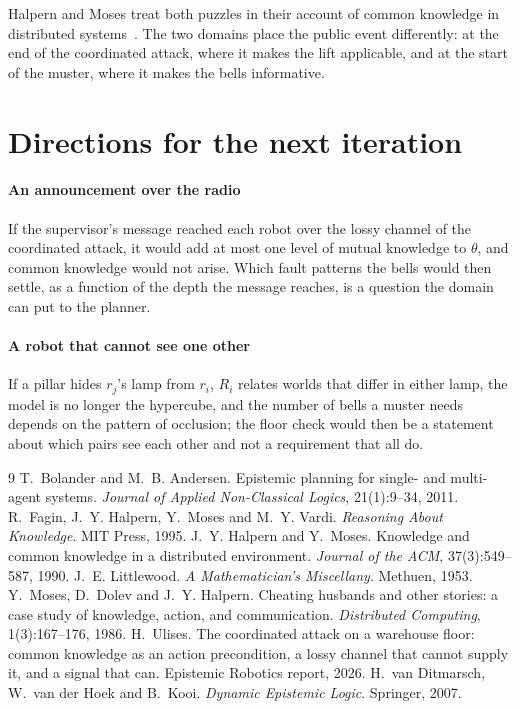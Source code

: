 \documentclass[11pt,a4paper]{article}
\theoremstyle{definition}
\newcommand{\some}{\theta}
\begin{document}
Halpern and Moses treat both puzzles in their account of common knowledge in
distributed systems~\cite{halpern1990}. The two domains place the public event
differently: at the end of the coordinated attack, where it makes the lift
applicable, and at the start of the muster, where it makes the bells
informative.

\section{Directions for the next iteration}
\label{sec:next}

\paragraph{An announcement over the radio} If the supervisor's message reached
each robot over the lossy channel of the coordinated attack, it would add at
most one level of mutual knowledge to $\some$, and common knowledge would not
arise. Which fault patterns the bells would then settle, as a function of the
depth the message reaches, is a question the domain can put to the planner.

\paragraph{A robot that cannot see one other} If a pillar hides $r_j$'s lamp from
$r_i$, $R_i$ relates worlds that differ in either lamp, the model is no longer
the hypercube, and the number of bells a muster needs depends on the pattern of
occlusion; the floor check would then be a statement about which pairs see
each other and not a requirement that all do.

\begin{thebibliography}{9}
 T.~Bolander and M.~B. Andersen.
  Epistemic planning for single- and multi-agent systems.
  \emph{Journal of Applied Non-Classical Logics}, 21(1):9--34, 2011.
 R.~Fagin, J.~Y. Halpern, Y.~Moses and M.~Y. Vardi.
  \emph{Reasoning About Knowledge}. MIT Press, 1995.
 J.~Y. Halpern and Y.~Moses.
  Knowledge and common knowledge in a distributed environment.
  \emph{Journal of the ACM}, 37(3):549--587, 1990.
 J.~E. Littlewood.
  \emph{A Mathematician's Miscellany}. Methuen, 1953.
 Y.~Moses, D.~Dolev and J.~Y. Halpern.
  Cheating husbands and other stories: a case study of knowledge, action, and
  communication. \emph{Distributed Computing}, 1(3):167--176, 1986.
 H.~Ulises.
  The coordinated attack on a warehouse floor: common knowledge as an action
  precondition, a lossy channel that cannot supply it, and a signal that can.
  Epistemic Robotics report, 2026.
 H.~van Ditmarsch, W.~van der Hoek and B.~Kooi.
  \emph{Dynamic Epistemic Logic}. Springer, 2007.
\end{thebibliography}
\end{document}
